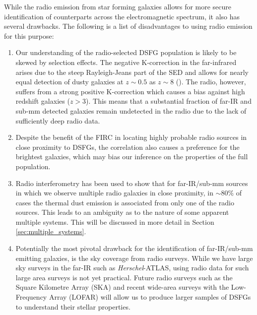 While the radio emission from star forming galaxies allows for more secure identification of counterparts across the electromagnetic spectrum, it also has several drawbacks. The following is a list of disadvantages to using radio emission for this purpose:

\begin{enumerate}
    \item Our understanding of the radio-selected DSFG population is likely to be skewed by selection effects. The negative K-correction in the far-infrared arises due to the steep Rayleigh-Jeans part of the SED and allows for nearly equal detection of dusty galaxies at $z \sim 0.5$ as $z \sim 8$ (\citealt{Blain_2002}). The radio, however, suffers from a strong positive K-correction which causes a bias against high redshift galaxies ($z > 3$). This means that a substantial fraction of far-IR and sub-mm detected galaxies remain undetected in the radio due to the lack of sufficiently deep radio data.
    \item Despite the benefit of the FIRC in locating highly probable radio sources in close proximity to DSFGs, the correlation also causes a preference for the brightest galaxies, which may bias our inference on the properties of the full population.
    \item Radio interferometry has been used to show that for far-IR/sub-mm sources in which we observe multiple radio galaxies in close proximity, in $\sim 80\%$ of cases the thermal dust emission is associated from only one of the radio sources. This leads to an ambiguity as to the nature of some apparent multiple systems. This will be discussed in more detail in Section \ref{sec:multiple_systems}.
    \item Potentially the most pivotal drawback for the identification of far-IR/sub-mm emitting galaxies, is the sky coverage from radio surveys. While we have large sky surveys in the far-IR such as \textit{Herschel}-ATLAS, using radio data for such large area surveys is not yet practical. Future radio surveys such as the Square Kilometre Array (SKA) and recent wide-area surveys with the Low-Frequency Array (LOFAR) will allow us to produce larger samples of DSFGs to understand their stellar properties.
\end{enumerate}

